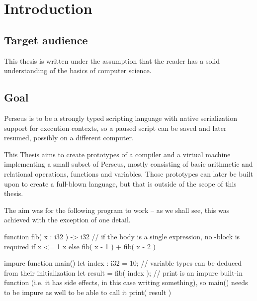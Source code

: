 
\chapter{Introduction} %


    
    \section{Target audience}
    This thesis is written under the assumption that the reader has a solid understanding of the basics of computer science.

	\section{Goal} %
	
	Perseus is to be a strongly typed scripting language with native serialization support for execution contexts, so a paused script can be saved and later resumed, possibly on a different computer.
	
	This Thesis aims to create prototypes of a compiler and a virtual machine implementing a small subset of Perseus, mostly consisting of basic arithmetic and relational operations, functions and variables. Those prototypes can later be built upon to create a full-blown language, but that is outside of the scope of this thesis.
	
	The aim was for the following program to work -- as we shall see, this was achieved with the exception of one detail.
	
	\begin{perseuslisting}[caption={Desired target language example},label={lst:target_language}]
function fib( x : i32 ) -> i32
    // if the body is a single expression, no {}-block is required
    if x <= 1
        x
    else
        fib( x - 1 ) + fib( x - 2 )

impure function main()
{
	let index : i32 = 10;
	// variable types can be deduced from their initialization
	let result = fib( index );
	// print is an impure built-in function (i.e. it has side effects, in this case writing something), so main() needs to be impure as well to be able to call it
	print( result )
}
	\end{perseuslisting}
	
